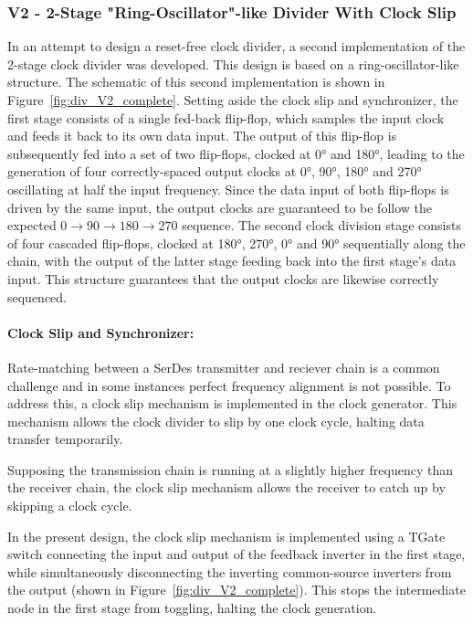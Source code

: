 \subsubsection{V2 - 2-Stage "Ring-Oscillator"-like Divider With Clock Slip}
In an attempt to design a reset-free clock divider, a second implementation of the 2-stage clock divider was developed. This design is based on a ring-oscillator-like structure. The schematic of this second implementation is shown in Figure~\ref{fig:div_V2_complete}. 
Setting aside the clock slip and synchronizer, the first stage consists of a single fed-back flip-flop, which samples the input clock and feeds it back to its own data input. The output of this flip-flop is subsequently fed into a set of two flip-flops, clocked at \ang{0} and \ang{180}, leading to the generation of four correctly-spaced output clocks at \ang{0}, \ang{90}, \ang{180} and \ang{270} oscillating at half the input frequency. 
Since the data input of both flip-flops is driven by the same input, the output clocks are guaranteed to be follow the expected \(0\rightarrow 90\rightarrow 180\rightarrow 270\) sequence.
The second clock division stage consists of four cascaded flip-flops, clocked at \ang{180}, \ang{270}, \ang{0} and \ang{90} sequentially along the chain, with the output of the latter stage feeding back into the first stage's data input. This structure guarantees that the output clocks are likewise correctly sequenced.

\paragraph{Clock Slip and Synchronizer:}
Rate-matching between a SerDes transmitter and reciever chain is a common challenge and in some instances perfect frequency alignment is not possible. To address this, a clock slip mechanism is implemented in the clock generator. This mechanism allows the clock divider to slip by one clock cycle, halting data transfer temporarily.

Supposing the transmission chain is running at a slightly higher frequency than the receiver chain, the clock slip mechanism allows the receiver to catch up by skipping a clock cycle. 

In the present design, the clock slip mechanism is implemented using a TGate switch connecting the input and output of the feedback inverter in the first stage, while simultaneously disconnecting the inverting common-source inverters from the output (shown in Figure~\ref{fig:div_V2_complete}). This stops the intermediate node in the first stage from toggling, halting the clock generation.

